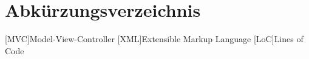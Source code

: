 \chapter*{Abkürzungsverzeichnis}
\label{abkürzungsverzeichnis}


\begin{acronym}
	[MVC]{Model-View-Controller}
	[XML]{Extensible Markup Language}
	[LoC]{Lines of Code}
\end{acronym}


